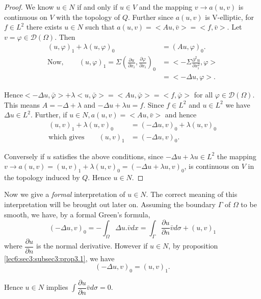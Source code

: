 \begin{proof}%
We know $u \in N$ if and only if $u \in V$ and the
mapping $v \rightarrow a(u, v)$ is continuous on $V$ with the topology
of $Q$. Further since $a(u, v)$ is V-elliptic, for $f \in L^2$
there exists $u \in N$ such that $a(u, v) = <Au, \bar{v}> =
<f, \bar{v}>$. Let $v =\varphi \in \mathscr{D}(\Omega)$. Then 
\begin{align*}
 (u, \varphi)_1 + \lambda (u, \varphi)_0 &= (Au, \varphi )_0.\\
\text{Now},\qquad (u, \varphi )_1 = \Sigma \left(\frac{\partial u} {\partial
  x_i}, \frac{\partial \varphi}{\partial x_i}\right)_0  &= <- \Sigma
\frac{\partial^2 u}{\partial x_i^2}, \varphi>\\ 
 &= <- \Delta u, \varphi>.
\end{align*}

Hence\pageoriginale $<- \Delta u, \bar{\varphi} > + \lambda < u, \bar{\varphi}> = <
Au, \bar{\varphi}> = <f, \bar{\varphi}>$ for all $\varphi \in
\mathscr{D} (\Omega)$. This means $A = - \Delta + \lambda$ and $-
\Delta u + \lambda u = f$. Since $f \in L^2$ and $u
\in L^2$ we have $\Delta u \in L^2$. Further, if $u
\in N, a(u, v) = <Au, \bar{v} > $ and hence 
\begin{align*}
(u, v)_1 + \lambda (u, v)_0 & = (- \Delta u, v)_0 + \lambda (u, v)_0\\
\text{which gives}\qquad (u, v)_1 &= (-\Delta u, v)_0.
\end{align*}

Conversely if $u$ satisfies the above conditions, since $-\Delta u +
\lambda u \in L^2$ the mapping $v \rightarrow a(u,v) = (u,v)_1
+ \lambda(u, v)_0 = (-\Delta u + \lambda u, v)_0$, is continuous on
$V$ in the topology induced by $Q$. Hence $u \in N$. 
\end{proof}

Now we give a \textit{formal} interpretation of $u \in N$. The
correct meaning of this interpretation will be brought out later
on. Assuming the boundary $\Gamma$ of $\Omega$ to be smooth, we have,
by a formal Green's formula, 
$$
(- \Delta u, v)_0 = - \int_{\Omega} \Delta u. \bar{v} dx =
\int_{\Gamma}\frac{\partial u} {\partial n} \bar{v} d \sigma + (u,
v)_1 
$$
where $\dfrac {\partial u}{\partial n}$ is the normal
derivative. However if $u \in N$, by proposition \ref{lec6:sec3:subsec3:prop3.1}, we
have  
$$
(- \Delta u, v)_0 = (u,v)_1.
$$

Hence $u \in N$ implies $\int \dfrac {\partial u}{\partial n}
\bar{v} d \sigma = 0$. 

